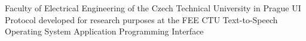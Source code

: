  Faculty of Electrical Engineering of the Czech Technical University in Prague
\abbrv[UIP]  UI Protocol developed for research purposes at the FEE CTU
\abbrv[TTS]  Text-to-Speech
\abbrv[OS]  Operating System
\abbrv[API]  Application Programming Interface

\stopAbbreviations

\endinput
